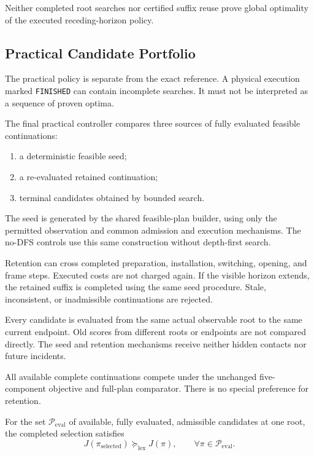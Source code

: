 \documentclass[conference]{IEEEtran}
\newcommand{\op}[1]{\texttt{#1}}
\begin{document}
Neither completed root searches nor certified suffix reuse
prove global optimality of the executed receding-horizon policy.

\subsection{Practical Candidate Portfolio}
\label{sec:portfolio}

The practical policy is separate from the exact reference.
A physical execution marked \op{FINISHED} can contain
incomplete searches.
It must not be interpreted as a sequence of proven optima.

The final practical controller compares three sources of
fully evaluated feasible continuations:

\begin{enumerate}
    \item a deterministic feasible seed;
    \item a re-evaluated retained continuation;
    \item terminal candidates obtained by bounded search.
\end{enumerate}

The seed is generated by the shared feasible-plan builder,
using only the permitted observation and common admission
and execution mechanisms.
The no-DFS controls use this same construction without
depth-first search.

Retention can cross completed preparation, installation,
switching, opening, and frame steps.
Executed costs are not charged again.
If the visible horizon extends, the retained suffix is
completed using the same seed procedure.
Stale, inconsistent, or inadmissible continuations are rejected.

Every candidate is evaluated from the same actual observable
root to the same current endpoint.
Old scores from different roots or endpoints are not compared
directly.
The seed and retention mechanisms receive neither hidden
contacts nor future incidents.

All available complete continuations compete under the
unchanged five-component objective and full-plan comparator.
There is no special preference for retention.

For the set $\mathcal{P}_{\mathrm{eval}}$ of available,
fully evaluated, admissible candidates at one root,
the completed selection satisfies
\begin{equation}
    J(\pi_{\mathrm{selected}})
    \succeq_{\mathrm{lex}}
    J(\pi),
    \qquad
    \forall \pi\in\mathcal{P}_{\mathrm{eval}}.
    \label{eq:portfolio-guarantee}
\end{equation}
\end{document}
